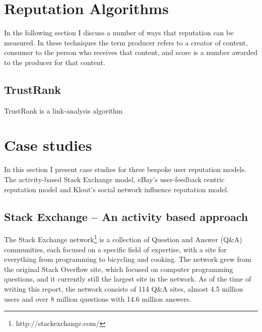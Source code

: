 \documentclass[]{final_report}
\begin{document}
\section{Reputation Algorithms}
In the following section I discuss a number of ways that reputation can be measured. In these techniques the term producer refers to a creator of content, consumer to the person who receives that content, and score is a number awarded to the producer for that content.


\subsection{TrustRank}
TrustRank is a link-analysis algorithm 

\section{Case studies}

In this section I present case studies for three bespoke user reputation models. The activity-based Stack Exchange model, eBay's user-feedback centric reputation model and Klout's social network influence reputation model.

\subsection{Stack Exchange -- An activity based approach}

The Stack Exchange network\footnote{http://stackexchange.com/} is a collection of Question and Answer (Q\&A) communities, each focused on a specific field of expertise, with a site for everything from programming to bicycling and cooking. The network grew from the original Stack Overflow site, which focused on computer programming questions, and it currently still the largest site in the network. As of the time of writing this report, the network consists of 114 Q\&A sites, almost 4.5 million users and over 8 million questions with 14.6 million answers.
\end{document}
